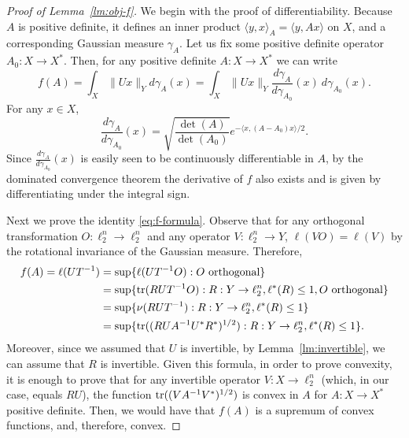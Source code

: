\begin{proof}[Proof of Lemma~\ref{lm:obj-f}]
  We begin with the proof of differentiability. Because $A$ is
  positive definite, it defines an inner product $\langle y,x\rangle_A
  = \langle y, Ax\rangle$ on $X$, and a corresponding Gaussian measure
  $\gamma_A$. Let us fix some positive definite operator $A_0:X \to
  X^*$. Then, for any positive definite $A: X \to X^*$ we can write
  \[
  f(A) = \int_X \|Ux\|_Y d\gamma_A(x)
  = \int_X \|Ux\|_Y \frac{d\gamma_{A}}{d\gamma_{A_0}}(x)\ d\gamma_{A_0}(x).
  \]
  For any $x \in X$, 
  \[
  \frac{d\gamma_{A}}{d\gamma_{A_0}}(x) =
  \sqrt{\frac{\det(A)}{\det(A_0)}} e^{-\langle x, (A - A_0)x\rangle / 2}.
  \]
  Since $\frac{d\gamma_{A}}{d\gamma_{A_0}}(x)$ is easily seen to be
  continuously differentiable in $A$, by the dominated convergence
  theorem the derivative of $f$ also exists and is given by
  differentiating under the integral sign.

  Next we prove the identity \eqref{eq:f-formula}. Observe that for
  any orthogonal transformation $O:\ell_2^n \to \ell_2^n$ and any
  operator $V: \ell_2^n \to Y$, $\ell(VO) = \ell(V)$ by the
  rotational invariance of the Gaussian measure. Therefore,
  \begin{align*}
  f(A) = \ell(UT^{-1}) &= \sup\{\ell(UT^{-1}O): O \text{ orthogonal}\}\\
  &= \sup\{\operatorname{tr}(RUT^{-1}O): R:Y\to\ell_2^n, \ell^*(R) \le 1, O \text{ orthogonal}\}\\
  &= \sup\{\nu(RUT^{-1}): R:Y\to\ell_2^n, \ell^*(R) \le 1\}\\
  &= \sup\{\operatorname{tr}((RUA^{-1}U^*R^*)^{1/2}): R:Y\to\ell_2^n, \ell^*(R) \le  1\}. 
  \end{align*}
  Moreover, since we assumed that $U$ is invertible, by
  Lemma~\ref{lm:invertible}, we can assume that $R$ is invertible.
  Given this formula, in order to prove convexity, it is enough to
  prove that for any invertible operator $V:X \to \ell^n_2$ (which, in
  our case, equals $RU$), the function $\operatorname{tr}((VA^{-1}V^*)^{1/2})$ is
  convex in $A$ for $A:X\to X^*$ positive definite. Then, we would
  have that $f(A)$ is a supremum of convex functions, and, therefore,
  convex.  


\end{proof}
